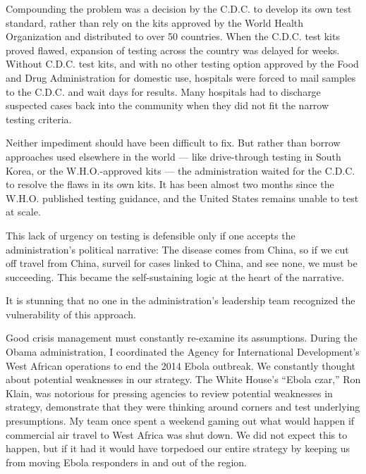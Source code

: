 Compounding the problem was a decision by the C.D.C. to develop its own
test standard, rather than rely on the kits approved by the World Health
Organization and distributed to over 50 countries. When the C.D.C. test
kits proved flawed, expansion of testing across the country was delayed
for weeks. Without C.D.C. test kits, and with no other testing option
approved by the Food and Drug Administration for domestic use, hospitals
were forced to mail samples to the C.D.C. and wait days for results.
Many hospitals had to discharge suspected cases back into the community
when they did not fit the narrow testing criteria.

Neither impediment should have been difficult to fix. But rather than
borrow approaches used elsewhere in the world --- like drive-through
testing in South Korea, or the W.H.O.-approved kits --- the
administration waited for the C.D.C. to resolve the flaws in its own
kits. It has been almost two months since the W.H.O. published testing
guidance, and the United States remains unable to test at scale.

This lack of urgency on testing is defensible only if one accepts the
administration's political narrative: The disease comes from China, so
if we cut off travel from China, surveil for cases linked to China, and
see none, we must be succeeding. This became the self-sustaining logic
at the heart of the narrative.

It is stunning that no one in the administration's leadership team
recognized the vulnerability of this approach.

Good crisis management must constantly re-examine its assumptions.
During the Obama administration, I coordinated the Agency for
International Development's West African operations to end the 2014
Ebola outbreak. We constantly thought about potential weaknesses in our
strategy. The White House's ``Ebola czar,'' Ron Klain, was notorious for
pressing agencies to review potential weaknesses in strategy,
demonstrate that they were thinking around corners and test underlying
presumptions. My team once spent a weekend gaming out what would happen
if commercial air travel to West Africa was shut down. We did not expect
this to happen, but if it had it would have torpedoed our entire
strategy by keeping us from moving Ebola responders in and out of the
region.

